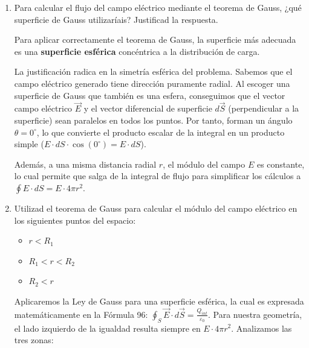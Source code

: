 \documentclass[11pt, a4paper]{article}
\newenvironment{problem}[1][Cuestión]{
		\vspace{0.5cm}
		\noindent{\Large\bfseries #1} \par\vspace{0.5cm}
}{
		\vspace{0.5cm}
}
\begin{document}
\begin{problem}[Cuestión 4]
\begin{enumerate}[label=\alph*)]
{					Sustituimos los valores en el Sistema Internacional:
					$$Q = 8 \text{ nC} = 8 \times 10^{-9} \text{ C}$$
					$$S = 4\pi (0,07)^2 \approx 0,06157 \text{ m}^2$$
					$$\sigma = \frac{8 \times 10^{-9} \text{ C}}{4\pi (0,07 \text{ m})^2} \approx 1,299 \times 10^{-7} \text{ C/m}^2 = 0,13 \; \mu\text{C/m}^2$$
					$$\boxed{\sigma= 0,13 \; \mu\text{C/m}^2}$$
				}

			\item Para calcular el flujo del campo eléctrico mediante el teorema de Gauss, ¿qué superficie de Gauss utilizaríais? Justificad la respuesta.

				{ \color{blue} 
					Para aplicar correctamente el teorema de Gauss, la superficie más adecuada es una \textbf{superficie esférica} concéntrica a la distribución de carga. 

					La justificación radica en la simetría esférica del problema. Sabemos que el campo eléctrico generado tiene dirección puramente radial. Al escoger una superficie de Gauss que también es una esfera, conseguimos que el vector campo eléctrico $\vec{E}$ y el vector diferencial de superficie $d\vec{S}$ (perpendicular a la superficie) sean paralelos en todos los puntos. Por tanto, forman un ángulo $\theta = 0^{\circ}$, lo que convierte el producto escalar de la integral en un producto simple ($E \cdot dS \cdot \cos(0^{\circ}) = E \cdot dS$).

					Además, a una misma distancia radial $r$, el módulo del campo $E$ es constante, lo cual permite que salga de la integral de flujo para simplificar los cálculos a $\oint E \cdot dS = E \cdot 4\pi r^2$.
				}

			\item Utilizad el teorema de Gauss para calcular el módulo del campo eléctrico en los siguientes puntos del espacio:

				\begin{itemize}
					\item $r < R_1$
					\item $R_1 < r < R_2$
					\item $R_2 < r$
				\end{itemize}

				{ \color{blue} 
					Aplicaremos la Ley de Gauss para una superficie esférica, la cual es expresada matemáticamente en la Fórmula 96: $\oint_{S} \vec{E} \cdot d\vec{S} = \frac{Q_{int}}{\varepsilon_0}$. Para nuestra geometría, el lado izquierdo de la igualdad resulta siempre en $E \cdot 4\pi r^2$. Analizamos las tres zonas:

}
\end{enumerate}
\end{problem}
\end{document}
